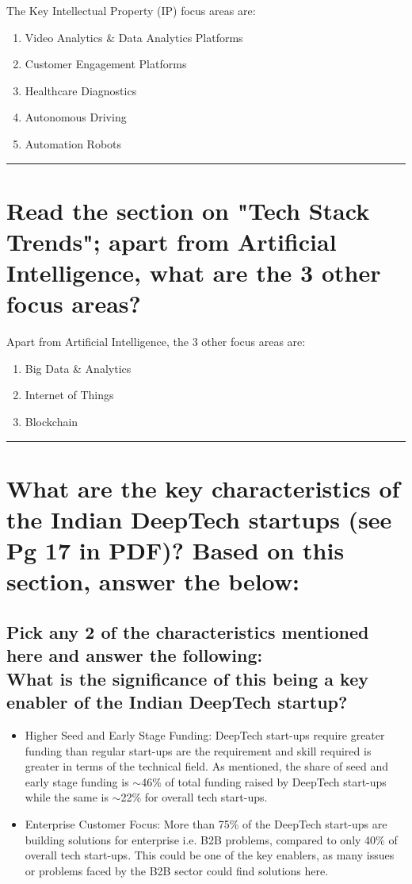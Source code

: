 \documentclass[a4paper]{article}
\begin{document}
\large{The Key Intellectual Property (IP) focus areas are:
\begin{enumerate}
    \item Video Analytics \& Data Analytics Platforms
    \item Customer Engagement Platforms
    \item Healthcare Diagnostics
    \item Autonomous Driving
    \item Automation Robots
\end{enumerate}
}

\rule{\textwidth}{0.4pt}

\section{Read the section on "Tech Stack Trends"; apart from Artificial Intelligence, what are the 3 other focus areas?}

\large{Apart from Artificial Intelligence, the 3 other focus areas are:
\begin{enumerate}
    \item Big Data \& Analytics
    \item Internet of Things
    \item Blockchain
\end{enumerate}
}

\rule{\textwidth}{0.4pt}

\section{What are the key characteristics of the Indian DeepTech startups (see Pg 17 in PDF)? Based on this section, answer the below:}

\subsection{Pick any 2 of the characteristics mentioned here and answer the following:
\\What is the significance of this being a key enabler of the Indian DeepTech startup?}

\large{
\begin{itemize}
    \item Higher Seed and Early Stage Funding: DeepTech start-ups require greater funding than regular start-ups are the requirement and skill required is greater in terms of the technical field. As mentioned, the share of seed and early stage funding is $\sim$46\% of total funding raised by DeepTech start-ups while the same is $\sim$22\% for overall tech start-ups.
    \item Enterprise Customer Focus: More than 75\% of the DeepTech start-ups are building solutions for enterprise i.e. B2B problems, compared to only 40\% of overall tech start-ups. This could be one of the key enablers, as many issues or problems faced by the B2B sector could find solutions here.
\end{itemize}
}
\end{document}
